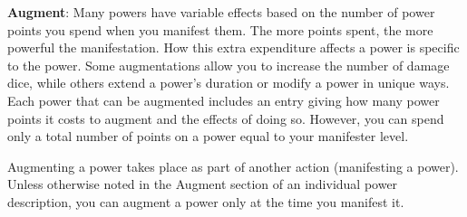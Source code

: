 \textbf{Augment}: Many powers have variable effects based on the number of power points you spend when you manifest them. The more points spent, the more powerful the manifestation. How this extra expenditure affects a power is specific to the power. Some augmentations allow you to increase the number of damage dice, while others extend a power's duration or modify a power in unique ways. Each power that can be augmented includes an entry giving how many power points it costs to augment and the effects of doing so. However, you can spend only a total number of points on a power equal to your manifester level.

Augmenting a power takes place as part of another action (manifesting a power). Unless otherwise noted in the Augment section of an individual power description, you can augment a power only at the time you manifest it.

